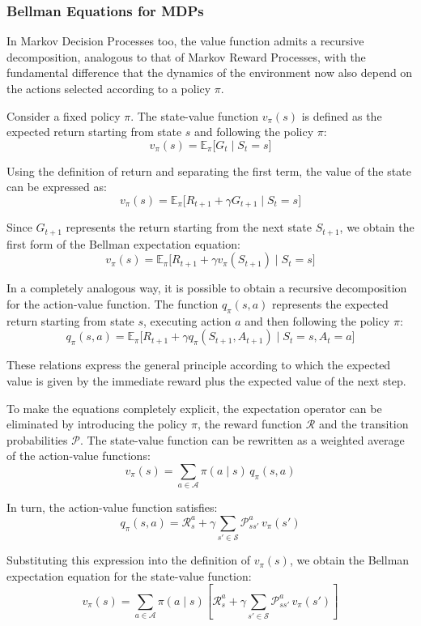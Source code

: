 \subsubsection{Bellman Equations for MDPs}

In Markov Decision Processes too, the value function admits a recursive decomposition, analogous to that of Markov Reward Processes, with the fundamental difference that the dynamics of the environment now also depend on the actions selected according to a policy $\pi$.

Consider a fixed policy $\pi$. The state-value function $v_\pi(s)$ is defined as the expected return starting from state $s$ and following the policy $\pi$:
\[
v_\pi(s) = \mathbb{E}_\pi \big[ G_t \mid S_t = s \big]
\]

Using the definition of return and separating the first term, the value of the state can be expressed as:
\[
v_\pi(s)
=
\mathbb{E}_\pi
\big[
R_{t+1} + \gamma G_{t+1}
\mid S_t = s
\big]
\]

Since $G_{t+1}$ represents the return starting from the next state $S_{t+1}$, we obtain the first form of the Bellman expectation equation:
\[
v_\pi(s)
=
\mathbb{E}_\pi
\big[
R_{t+1} + \gamma v_\pi(S_{t+1})
\mid S_t = s
\big]
\]

In a completely analogous way, it is possible to obtain a recursive decomposition for the action-value function. The function $q_\pi(s,a)$ represents the expected return starting from state $s$, executing action $a$ and then following the policy $\pi$:
\[
q_\pi(s,a)
=
\mathbb{E}_\pi
\big[
R_{t+1} + \gamma q_\pi(S_{t+1}, A_{t+1})
\mid S_t = s, A_t = a
\big]
\]

These relations express the general principle according to which the expected value is given by the immediate reward plus the expected value of the next step.

To make the equations completely explicit, the expectation operator can be eliminated by introducing the policy $\pi$, the reward function $\mathcal{R}$ and the transition probabilities $\mathcal{P}$. The state-value function can be rewritten as a weighted average of the action-value functions:
\[
v_\pi(s) = \sum_{a \in \mathcal{A}} \pi(a \mid s)\, q_\pi(s,a)
\]

In turn, the action-value function satisfies:
\[
q_\pi(s,a)
=
\mathcal{R}_s^a
+
\gamma
\sum_{s' \in \mathcal{S}}
\mathcal{P}_{ss'}^a \, v_\pi(s')
\]

Substituting this expression into the definition of $v_\pi(s)$, we obtain the Bellman expectation equation for the state-value function:
\[
v_\pi(s)
=
\sum_{a \in \mathcal{A}}
\pi(a \mid s)
\left[
\mathcal{R}_s^a
+
\gamma
\sum_{s' \in \mathcal{S}}
\mathcal{P}_{ss'}^a
\, v_\pi(s')
\right]
\]

